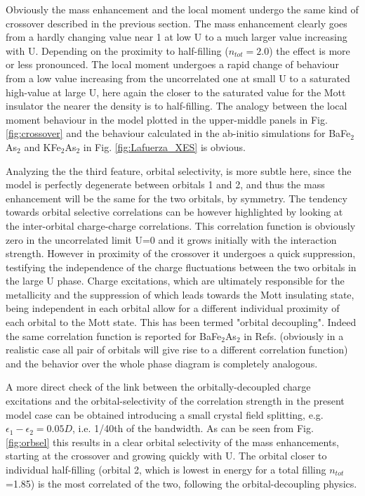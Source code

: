 \documentclass[12pt,twoside]{article}
\def\eps{\epsilon}
\begin{document}
Obviously the mass enhancement and the local moment undergo the same kind of crossover described in the previous section. The mass enhancement clearly goes from a hardly changing value near 1 at low U to a much larger value increasing with U. 
Depending on the proximity to half-filling ($n_{tot}=2.0$) the effect is more or less pronounced.
The local moment undergoes a rapid change of behaviour from a low value increasing from the uncorrelated one at small U to a saturated high-value at large U, here again the closer to the saturated value for the Mott insulator the nearer the density is to half-filling.
The analogy between the local moment behaviour in the model plotted in the upper-middle panels in Fig. \ref{fig:crossover} and the behaviour calculated in the ab-initio simulations for BaFe$_2$As$_2$ and KFe$_2$As$_2$ in Fig. \ref{fig:Lafuerza_XES} is obvious.

Analyzing the the third feature, orbital selectivity, is more subtle here, since the model is perfectly degenerate between orbitals 1 and 2, and thus the mass enhancement will be the same for the two orbitals, by symmetry.
The tendency towards orbital selective correlations can be however highlighted by looking at the inter-orbital charge-charge correlations.
This correlation function is obviously zero in the uncorrelated limit U=0 and it grows initially with the interaction strength. However in proximity of the crossover it undergoes a quick suppression, testifying the independence of the charge fluctuations between the two orbitals in the large U phase. Charge excitations, which are ultimately responsible for the metallicity and the suppression of which leads towards the Mott insulating state, being independent in each orbital allow for a different individual proximity of each orbital to the Mott state. This has been termed "orbital decoupling"\cite{demedici_MottHund,georges_annrev,deMedici_OSM_FeSC,demedici-SpringerBook,demedici_Vietri}.
Indeed the same correlation function is reported for BaFe$_2$As$_2$ in Refs. \cite{deMedici_OSM_FeSC,demedici_Vietri} (obviously in a realistic case all pair of orbitals will give rise to a different correlation function) and the behavior over the whole phase diagram is completely analogous.

A more direct check of the link between the orbitally-decoupled charge excitations and the orbital-selectivity of the correlation strength in the present model case can be obtained introducing a small crystal field splitting, e.g. $\eps_1-\eps_2=0.05D$, i.e. 1/40th of the bandwidth.
As can be seen from Fig. \ref{fig:orbsel} this results in a clear orbital selectivity of the mass enhancements, starting at the crossover and growing quickly with U. The orbital closer to individual half-filling (orbital 2, which is lowest in energy for a total filling $n_{tot}$=1.85) is the most correlated of the two, following the orbital-decoupling physics.
\end{document}
